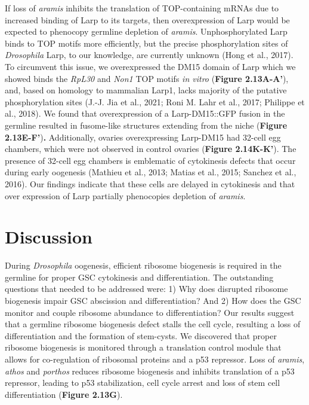 \documentclass[12pt,oneside]{reedthesis}
\begin{document}
If loss of \emph{aramis} inhibits the translation of TOP-containing mRNAs due
to increased binding of Larp to its targets, then overexpression of Larp
would be expected to phenocopy germline depletion of \emph{aramis}.
Unphosphorylated Larp binds to TOP motifs more efficiently, but the
precise phosphorylation sites of \emph{Drosophila} Larp, to our knowledge,
are currently unknown (Hong et al., 2017). To circumvent this issue, we
overexpressed the DM15 domain of Larp which we showed binds the \emph{RpL30}
and \emph{Non1} TOP motifs \emph{in vitro} (\textbf{Figure 2.13A-A'}), and, based on
homology to mammalian Larp1, lacks majority of the putative
phosphorylation sites (J.-J. Jia et al., 2021; Roni M. Lahr et al., 2017; Philippe et al., 2018). We found that overexpression of a
Larp-DM15::GFP fusion in the germline resulted in fusome-like structures
extending from the niche (\textbf{Figure 2.13E-F'})\textbf{.} Additionally, ovaries
overexpressing Larp-DM15 had 32-cell egg chambers, which were not
observed in control ovaries (\textbf{Figure 2.14K-K'}). The presence of 32-cell
egg chambers is emblematic of cytokinesis defects that occur during
early oogenesis (Mathieu et al., 2013; Matias et al., 2015; Sanchez et al., 2016). Our
findings indicate that these cells are delayed in cytokinesis and that
over expression of Larp partially phenocopies depletion of \emph{aramis}.

\hypertarget{discussion}{%
\section{Discussion}\label{discussion}}

During \emph{Drosophila} oogenesis, efficient ribosome biogenesis is required
in the germline for proper GSC cytokinesis and differentiation. The
outstanding questions that needed to be addressed were: 1) Why does
disrupted ribosome biogenesis impair GSC abscission and differentiation?
And 2) How does the GSC monitor and couple ribosome abundance to
differentiation? Our results suggest that a germline ribosome biogenesis
defect stalls the cell cycle, resulting a loss of differentiation and
the formation of stem-cysts. We discovered that proper ribosome
biogenesis is monitored through a translation control module that allows
for co-regulation of ribosomal proteins and a p53 repressor. Loss of
\emph{aramis}, \emph{athos} and \emph{porthos} reduces ribosome biogenesis and inhibits
translation of a p53 repressor, leading to p53 stabilization, cell cycle
arrest and loss of stem cell differentiation (\textbf{Figure 2.13G}).
\end{document}

